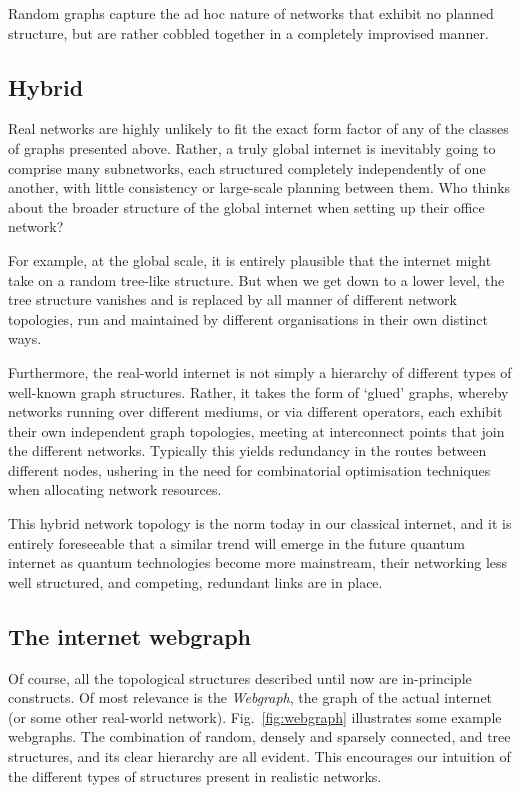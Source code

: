 \documentclass[aps, rmp, twocolumn, amsmath, amssymb, nofootinbib, superscriptaddress, longbibliography, floatfix, table-of-contents, eqsecnum]{revtex4-1}
\begin{document}
Random graphs capture the ad hoc nature of networks that exhibit no planned structure, but are rather cobbled together in a completely improvised manner.

%
%

\subsection{Hybrid} 

Real networks are highly unlikely to fit the exact form factor of any of the classes of graphs presented above. Rather, a truly global internet is inevitably going to comprise many subnetworks, each structured completely independently of one another, with little consistency or large-scale planning between them. Who thinks about the broader structure of the global internet when setting up their office network?

For example, at the global scale, it is entirely plausible that the internet might take on a random tree-like structure. But when we get down to a lower level, the tree structure vanishes and is replaced by all manner of different network topologies, run and maintained by different organisations in their own distinct ways.

Furthermore, the real-world internet is not simply a hierarchy of different types of well-known graph structures. Rather, it takes the form of `glued' graphs, whereby networks running over different mediums, or via different operators, each exhibit their own independent graph topologies, meeting at interconnect points that join the different networks. Typically this yields redundancy in the routes between different nodes, ushering in the need for combinatorial optimisation techniques when allocating network resources.

This hybrid network topology is the norm today in our classical internet, and it is entirely foreseeable that a similar trend will emerge in the future quantum internet as quantum technologies become more mainstream, their networking less well structured, and competing, redundant links are in place.

%
%

\subsection{The internet webgraph} 

Of course, all the topological structures described until now are in-principle constructs. Of most relevance is the \textit{Webgraph}, the graph of the actual internet (or some other real-world network). Fig.~\ref{fig:webgraph} illustrates some example webgraphs. The combination of random, densely and sparsely connected, and tree structures, and its clear hierarchy are all evident. This encourages our intuition of the different types of structures present in realistic networks.
\end{document}
